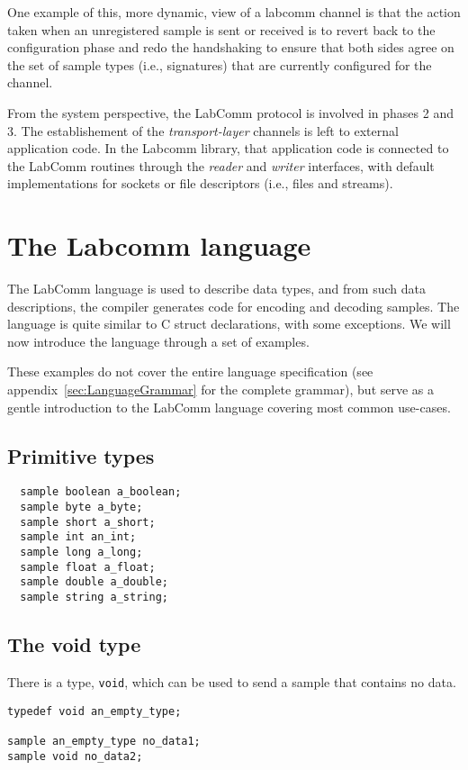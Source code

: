 \documentclass[a4paper]{article}
\begin{document}
One example of this, more dynamic, view of a labcomm channel is that the
action taken when an unregistered sample is sent or received is to
revert back to the configuration phase and redo the handshaking to
ensure that both sides agree on the set of sample types (i.e.,
signatures) that are currently configured for the channel.

From the system perspective, the LabComm protocol is involved in
phases 2 and 3. The establishement of the \emph{transport-layer}
channels is left to external application code. In the Labcomm library,
that application code is connected to the LabComm routines through
the \emph{reader} and \emph{writer} interfaces,
with default implementations for sockets or file descriptors (i.e.,
files and streams).


\section{The Labcomm language}

The LabComm language is used to describe data types, and from such data
descriptions, the compiler generates code for encoding and decoding
samples. The language is quite similar to C struct declarations, with
some exceptions. We will now introduce the language through a set of
examples.

These examples do not cover the entire language
specification (see appendix~\ref{sec:LanguageGrammar} for the complete
grammar), but serve as a gentle introduction to the LabComm
language covering most common use-cases.

\subsection{Primitive types}

\begin{verbatim}
  sample boolean a_boolean;
  sample byte a_byte;
  sample short a_short;
  sample int an_int;
  sample long a_long;
  sample float a_float;
  sample double a_double;
  sample string a_string;
\end{verbatim}

\subsection{The void type}

There is a type, \verb+void+, which can be used to send
a sample that contains no data. 

\begin{verbatim}
typedef void an_empty_type;

sample an_empty_type no_data1;
sample void no_data2;
\end{verbatim}
\end{document}
